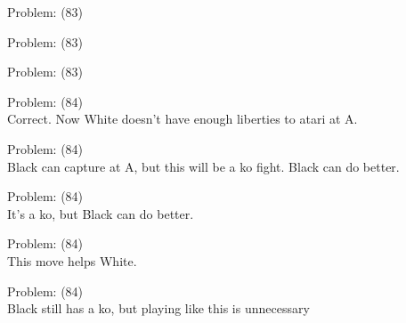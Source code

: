 \documentclass[11pt]{article}
\begin{document}
\begin{minipage}[t]{0.5\textwidth}
  {\centering
  
Problem: (83)\\
  }
\end{minipage}
\begin{minipage}[t]{0.5\textwidth}
  {\centering
  
Problem: (83)\\
  }
\end{minipage}
\begin{minipage}[t]{0.5\textwidth}
  {\centering
  
Problem: (83)\\
  }
\end{minipage}
\begin{minipage}[t]{0.5\textwidth}
  {\centering
  
Problem: (84)\\
Correct. Now White doesn't have enough liberties to atari at A.\\
  }
\end{minipage}
\begin{minipage}[t]{0.5\textwidth}
  {\centering
  
Problem: (84)\\
Black can capture at A, but this will be a ko fight. Black can do better.\\
  }
\end{minipage}
\begin{minipage}[t]{0.5\textwidth}
  {\centering
  
Problem: (84)\\
It's a ko, but Black can do better.\\
  }
\end{minipage}
\begin{minipage}[t]{0.5\textwidth}
  {\centering
  
Problem: (84)\\
This move helps White.\\
  }
\end{minipage}
\begin{minipage}[t]{0.5\textwidth}
  {\centering
  
Problem: (84)\\
Black still has a ko, but playing like this is unnecessary\\
  }
\end{minipage}
\end{document}
